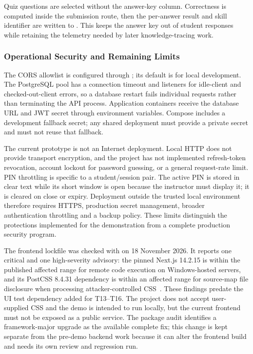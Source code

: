 Quiz questions are selected without the answer-key column. Correctness is computed inside the submission route, then the per-answer result and skill identifier are written to . This keeps the answer key out of student responses while retaining the telemetry needed by later knowledge-tracing work.

\subsubsection{Operational Security and Remaining Limits}

The CORS allowlist is configured through ; its default is for local development. The PostgreSQL pool has a connection timeout and listeners for idle-client and checked-out-client errors, so a database restart fails individual requests rather than terminating the API process. Application containers receive the database URL and JWT secret through environment variables. Compose includes a development fallback secret; any shared deployment must provide a private secret and must not reuse that fallback.

The current prototype is not an Internet deployment. Local HTTP does not provide transport encryption, and the project has not implemented refresh-token revocation, account lockout for password guessing, or a general request-rate limit. PIN throttling is specific to a student/session pair. The active PIN is stored in clear text while its short window is open because the instructor must display it; it is cleared on close or expiry. Deployment outside the trusted local environment therefore requires HTTPS, production secret management, broader authentication throttling and a backup policy. These limits distinguish the protections implemented for the demonstration from a complete production security program.

The frontend lockfile was checked with  on 18 November 2026. It reports one critical and one high-severity advisory: the pinned Next.js 14.2.15 is within the published affected range for remote code execution on Windows-hosted servers, and its PostCSS 8.4.31 dependency is within an affected range for source-map file disclosure when processing attacker-controlled CSS~\cite{next2026windowsrce,postcss2026fileread}. These findings predate the UI test dependency added for T13--T16. The project does not accept user-supplied CSS and the demo is intended to run locally, but the current frontend must not be exposed as a public service. The package audit identifies a framework-major upgrade as the available complete fix; this change is kept separate from the pre-demo backend work because it can alter the frontend build and needs its own review and regression run.

